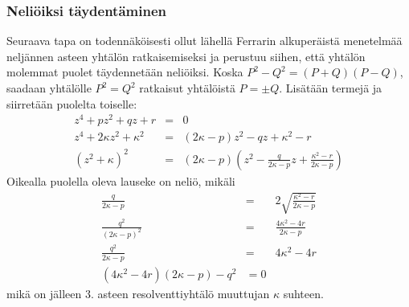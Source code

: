 \documentclass[a4paper,12pt,twoside]{article}
\begin{document}
\subsubsection{Neliöiksi täydentäminen}
Seuraava tapa on todennäköisesti ollut lähellä Ferrarin alkuperäistä menetelmää neljännen asteen yhtälön ratkaisemiseksi ja perustuu siihen, että yhtälön molemmat puolet täydennetään neliöiksi. Koska $P^2-Q^2=(P+Q)(P-Q)$, saadaan yhtälölle $P^2=Q^2$ ratkaisut yhtälöistä $P=\pm Q$. Lisätään termejä ja siirretään puolelta toiselle:
\begin{eqnarray*}
  z^4+pz^2+qz+r & = & 0 \\
  z^4+2\kappa z^2+\kappa^2 & = & (2\kappa-p) z^2-qz+\kappa^2-r \\
  \left(z^2+\kappa\right)^2 & = & \left(2\kappa-p\right)\left(z^2-\frac{q}{2\kappa -p}z+\frac{\kappa^2-r}{2\kappa -p}\right)
\end{eqnarray*}
Oikealla puolella oleva lauseke on neliö, mikäli
\begin{eqnarray*}
  \frac{q}{2\kappa -p} & = & 2\sqrt{\frac{\kappa^2-r}{2\kappa -p}} \\
  \frac{q^2}{(2\kappa -p)^2} & = & \frac{4\kappa^2-4r}{2\kappa -p} \\
  \frac{q^2}{2\kappa -p} & = & 4\kappa^2-4r \\
  (4\kappa^2-4r)(2\kappa -p)-q^2 & = 0
\end{eqnarray*}
mikä on jälleen 3. asteen resolventtiyhtälö muuttujan $\kappa$ suhteen.
\end{document}
